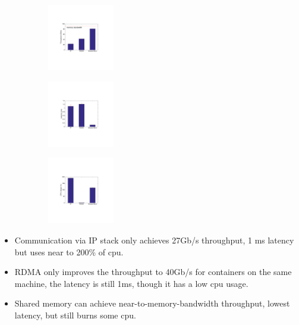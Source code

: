 \begin{figure}[t]
     \centering 
     \begin{subfigure}[t]
     \centering 
     \includegraphics[width=0.32\textwidth]{figures/motivation/eval_baremetal_thr.pdf}      
     \end{subfigure}      
     \begin{subfigure}[t]
     \centering 
     \includegraphics[width=0.32\textwidth]{figures/motivation/eval_baremetal_latency.pdf}      
     \end{subfigure}      
     \begin{subfigure}[t]
     \centering 
     \includegraphics[width=0.32\textwidth]{figures/motivation/eval_baremetal_cpu.pdf}      
     \end{subfigure}           
     \label{fig:eval_baremetal_thr_latency_cpu}
     \caption{} 
\end{figure} 

\begin{itemize}
  \item Communication via IP stack only achieves 27Gb/s throughput, 1 ms latency but uses near to 200\% of cpu.
  \item RDMA only improves the throughput to 40Gb/s for containers on the same machine, the latency is still 1ms, though it has a low cpu usage.
  \item Shared memory can achieve near-to-memory-bandwidth throughput, lowest latency, but still burns some cpu. 
\end{itemize}


